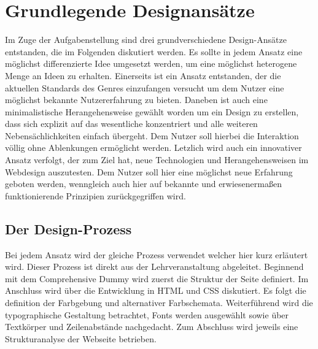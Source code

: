 \section{Grundlegende Designansätze}
Im Zuge der Aufgabenstellung sind drei grundverschiedene Design-Ansätze entstanden, die im Folgenden diskutiert werden. Es sollte in jedem Ansatz eine möglichst differenzierte Idee umgesetzt werden, um eine möglichst heterogene Menge an Ideen zu erhalten.
Einerseits ist ein Ansatz entstanden, der die aktuellen Standards des Genres einzufangen versucht um dem Nutzer eine möglichst bekannte Nutzererfahrung zu bieten.
Daneben ist auch eine minimalistische Herangehensweise gewählt worden um ein Design zu erstellen, dass sich explizit auf das wesentliche konzentriert und alle weiteren Nebensächlichkeiten einfach übergeht. Dem Nutzer soll hierbei die Interaktion völlig ohne Ablenkungen ermöglicht werden.
Letzlich wird auch ein innovativer Ansatz verfolgt, der zum Ziel hat, neue Technologien und Herangehensweisen im Webdesign auszutesten. Dem Nutzer soll hier eine möglichst neue Erfahrung geboten werden, wenngleich auch hier auf bekannte und erwiesenermaßen funktionierende Prinzipien zurückgegriffen wird.
\subsection{Der Design-Prozess}
Bei jedem Ansatz wird der gleiche Prozess verwendet welcher hier kurz erläutert wird. Dieser Prozess ist direkt aus der Lehrveranstaltung abgeleitet.
Beginnend mit dem Comprehensive Dummy wird zuerst die Struktur der Seite definiert. Im Anschluss wird über die Entwicklung in HTML und CSS diskutiert. Es folgt die definition der Farbgebung und alternativer Farbschemata. Weiterführend wird die typographische Gestaltung betrachtet, Fonts werden ausgewählt sowie über Textkörper und Zeilenabstände nachgedacht. Zum Abschluss wird jeweils eine Strukturanalyse der Webseite betrieben.